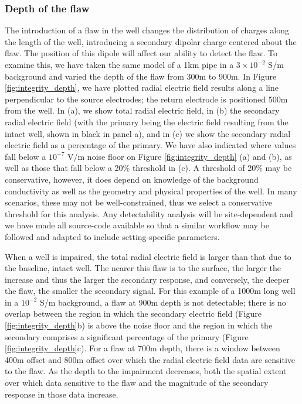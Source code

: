 \subsubsection{Depth of the flaw}
The introduction of a flaw in the well changes the distribution of charges along the length of the well, introducing a secondary dipolar charge centered about the flaw. The position of this dipole will affect our ability to detect the flaw. To examine this, we have taken the same model of a 1km pipe in a $3 \times 10^{-2}$ S/m background and varied the depth of the flaw from 300m to 900m. In Figure \ref{fig:integrity_depth}, we have plotted radial electric field results along a line perpendicular to the source electrodes; the return electrode is positioned 500m from the well. In (a), we show total radial electric field, in (b) the secondary radial electric field (with the primary being the electric field resulting from the intact well, shown in black in panel a), and in (c) we show the secondary radial electric field as a percentage of the primary. We have also indicated where values fall below a $10^{-7}$ V/m noise floor on Figure \ref{fig:integrity_depth} (a) and (b), as well as those that fall below a 20\% threshold in (c). A threshold of 20\% may be conservative, however, it does depend on knowledge of the background conductivity as well as the geometry and physical properties of the well. In many scenarios, these may not be well-constrained, thus we select a conservative threshold for this analysis. Any detectability analysis will be site-dependent and we have made all source-code available so that a similar workflow may be followed and adapted to include setting-specific parameters.

When a well is impaired, the total radial electric field is larger than that due to the baseline, intact well. The nearer this flaw is to the surface, the larger the increase and thus the larger the secondary response, and conversely, the deeper the flaw, the smaller the secondary signal. For this example of a 1000m long well in a $10^{-2}$ S/m background, a flaw at 900m depth is not detectable; there is no overlap between the region in which the secondary electric field (Figure \ref{fig:integrity_depth}b) is above the noise floor and the region in which the secondary comprises a significant percentage of the primary (Figure \ref{fig:integrity_depth}c). For a flaw at 700m depth, there is a window between 400m offset and 800m offset over which the radial electric field data are sensitive to the flaw. As the depth to the impairment decreases, both the spatial extent over which data sensitive to the flaw and the magnitude of the secondary response in those data increase.



